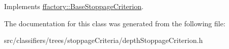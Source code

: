 Implements \hyperlink{classffactory_1_1_base_stoppage_criterion_a47728f0c9b241133e228ea5956248241}{ffactory\-::\-Base\-Stoppage\-Criterion}.



The documentation for this class was generated from the following file\-:\begin{DoxyCompactItemize}
\item 
src/classifiers/trees/stoppage\-Criteria/depth\-Stoppage\-Criterion.\-h\end{DoxyCompactItemize}
